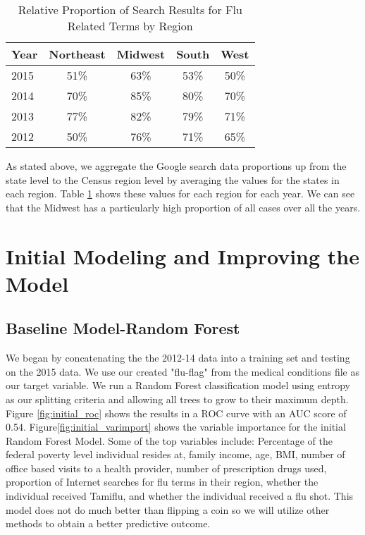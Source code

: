 \documentclass[twoside,11pt]{article}
\begin{document}
\begin{table}[h]
\centering
\caption{Relative Proportion of Search Results for Flu Related Terms by Region}
\label{flu_prop}
\begin{tabular}{lcccc}
\hline
Year & Northeast & Midwest & South & West\\ \hline
2015 & 51\% & 63\% & 53\% & 50\%\\
2014 & 70\% & 85\% & 80\% & 70\%\\
2013 & 77\% & 82\% & 79\% & 71\%\\
2012 & 50\% & 76\% & 71\% & 65\%\\
\end{tabular}
\end{table}

As stated above, we aggregate the Google search data proportions up from the state level to the Census region level by averaging the values for the states in each region.  Table \ref{flu_prop} shows these values for each region for each year.  We can see that the Midwest has a particularly high proportion of all cases over all the years.

\section{Initial Modeling and Improving the Model}
\subsection*{Baseline Model-Random Forest}

We began by concatenating the the 2012-14 data into a training set and testing on the 2015 data.  We use our created "flu-flag" from the medical conditions file as our target variable.  We run a Random Forest classification model using entropy as our splitting criteria and allowing all trees to grow to their maximum depth.  Figure \ref{fig:initial_roc} shows the results in a ROC curve with an AUC score of 0.54.  Figure\ref{fig:initial_varimport} shows the variable importance for the initial Random Forest Model.  Some of the top variables include: Percentage of the federal poverty level individual resides at, family income, age, BMI, number of office based visits to a health provider, number of prescription drugs used, proportion of Internet searches for flu terms in their region, whether the individual received Tamiflu, and whether the individual received a flu shot.  This model does not do much better than flipping a coin so we will utilize other methods to obtain a better predictive outcome.   
\end{document}
